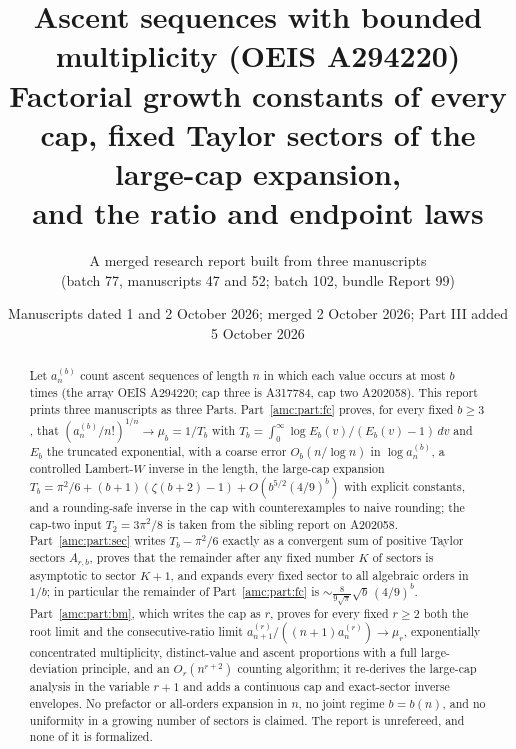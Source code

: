\documentclass[11pt,letterpaper]{article}
\title{Ascent sequences with bounded multiplicity (OEIS A294220)\\[4pt]
\large Factorial growth constants of every cap, fixed Taylor sectors of the large-cap expansion,\\ and the ratio and endpoint laws}
\author{A merged research report built from three manuscripts\\
(batch 77, manuscripts 47 and 52; batch 102, bundle Report 99)}
\date{Manuscripts dated 1 and 2 October 2026; merged 2 October 2026; Part III added 5 October 2026}
\theoremstyle{remark}\newtheorem{remark}[theorem]{Remark}
\begin{document}
\hypersetup{pageanchor=false}
\maketitle
\begin{abstract}
Let $a_n^{(b)}$ count ascent sequences of length $n$ in which each value occurs at most $b$ times (the array OEIS A294220; cap three is A317784, cap two A202058). This report prints three manuscripts as three Parts. Part~\ref{amc:part:fc} proves, for every fixed $b\ge3$, that $(a_n^{(b)}/n!)^{1/n}\to\mu_b=1/T_b$ with $T_b=\int_0^\infty\log E_b(v)/(E_b(v)-1)\,dv$ and $E_b$ the truncated exponential, with a coarse error $O_b(n/\log n)$ in $\log a_n^{(b)}$, a controlled Lambert-$W$ inverse in the length, the large-cap expansion $T_b=\pi^2/6+(b+1)(\zeta(b+2)-1)+O(b^{5/2}(4/9)^b)$ with explicit constants, and a rounding-safe inverse in the cap with counterexamples to naive rounding; the cap-two input $T_2=3\pi^2/8$ is taken from the sibling report on A202058. Part~\ref{amc:part:sec} writes $T_b-\pi^2/6$ exactly as a convergent sum of positive Taylor sectors $A_{r,b}$, proves that the remainder after any fixed number $K$ of sectors is asymptotic to sector $K+1$, and expands every fixed sector to all algebraic orders in $1/b$; in particular the remainder of Part~\ref{amc:part:fc} is $\sim\frac8{9\sqrt\pi}\sqrt b\,(4/9)^b$. Part~\ref{amc:part:bm}, which writes the cap as $r$, proves for every fixed $r\ge2$ both the root limit and the consecutive-ratio limit $a^{(r)}_{n+1}/((n+1)a^{(r)}_n)\to\mu_r$, exponentially concentrated multiplicity, distinct-value and ascent proportions with a full large-deviation principle, and an $O_r(n^{r+2})$ counting algorithm; it re-derives the large-cap analysis in the variable $r+1$ and adds a continuous cap and exact-sector inverse envelopes. No prefactor or all-orders expansion in $n$, no joint regime $b=b(n)$, and no uniformity in a growing number of sectors is claimed. The report is unrefereed, and none of it is formalized.
\end{abstract}
\setcounter{tocdepth}{2}
\tableofcontents
\hypersetup{pageanchor=true}
\end{document}
